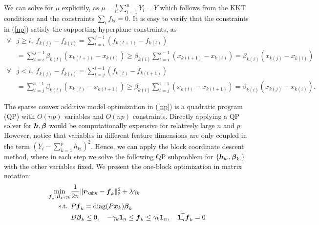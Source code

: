 We can solve for $\mu$ explicitly, as  
$\mu = \frac{1}{n} \sum_{i=1}^n Y_i = \bar{Y}$ which follows from the
KKT conditions
and the constraints $\sum_i f_{ki} = 0$.
It is easy to verify that the constraints in (\ref{np}) satisfy the supporting hyperplane constraints, as
\begin{align*}
  \forall & j\geq i, \; f_{k(j)}-f_{k(i)}  = \sum\limits_{t=i}^{j-1}(f_{k(t+1)}-f_{k(t)}) \\
   &= \sum\limits_{t=i}^{j-1}\beta_{k(t)}(x_{k(t+1)}-x_{k(t)})
   \geq \beta_{k(i)}\sum\limits_{t=i}^{j-1}(x_{k(t+1)}-x_{k(t)}) 
  = \beta_{k(i)}(x_{k(j)}-x_{k(i)}) \\
  \forall & j<i,\;  f_{k(j)}-f_{k(i)} =
                \sum\limits_{t=j}^{i-1}(f_{k(t)}-f_{k(t+1)}) \\
     & = \sum\limits_{t=j}^{i-1}\beta_{k(t)}(x_{k(t)}-x_{k(t+1)}) 
     \geq \beta_{k(i)}\sum\limits_{t=j}^{i-1}(x_{k(t)}-x_{k(t+1)}) = \beta_{k(i)}(x_{k(j)}-x_{k(i)}).
\end{align*}



The sparse convex additive model optimization in (\ref{np}) is a quadratic program (QP) with
$O(np)$ variables and $O(np)$ constraints. 
Directly applying a QP solver for $\boldsymbol{h},
\boldsymbol{\beta}$ would be computationally expensive for relatively large
$n$ and $p$. However, notice that variables in different feature
dimensions are only coupled in the term
$(Y_{i}-\sum_{k=1}^{p}h_{ki})^{2}$. Hence, we can apply the block
coordinate descent method, where in each step we solve the following
QP subproblem for $\{\boldsymbol{h}_{k\cdot},\boldsymbol{\beta}_{k\cdot}\}$ with the
other variables fixed. We present the one-block optimization in matrix notation:
\begin{align}
\min_{ \bds{f}_k, \bds{\beta}_k, \gamma_k}& \frac{1}{2n} \| \bds{r}_{\mh k} - \bds{f}_k \|_2^2 
     + \lambda \gamma_k \label{opt:1d_compact} \\
 \textrm{s.t. } & P \bds{f}_k = \diag(P \bds{x}_k)  \bds{\beta}_k \nonumber \\
   & D \bds{\beta}_k \leq 0 ,
   \quad -\gamma_k \mathbf{1}_n \leq \bds{f}_k \leq \gamma_k \mathbf{1}_n,
   \quad \mathbf{1}_n^\tran \bds{f}_k = 0 \nonumber
\end{align}

